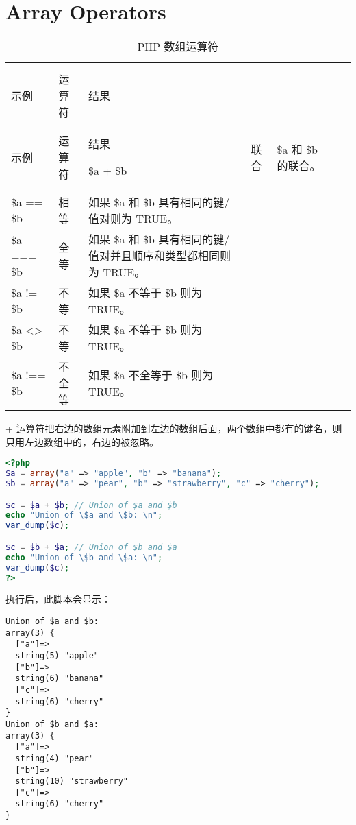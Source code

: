 \section{Array Operators}

\begin{longtable}{|l|l|l|}
\tabularnewline\hline
示例&运算符		&结果
\endhead

\caption{PHP 数组运算符}\\
\hline
示例&运算符		&结果
\endfirsthead

\endfoot

\endlastfoot
\hline
\$a + \$b		&联合	&\$a 和 \$b 的联合。\\
\hline
\$a == \$b	&相等	&如果 \$a 和 \$b 具有相同的键/值对则为 TRUE。\\
\hline
\$a === \$b	&全等	&如果 \$a 和 \$b 具有相同的键/值对并且顺序和类型都相同则为 TRUE。\\
\hline
\$a != \$b	&不等	&如果 \$a 不等于 \$b 则为 TRUE。\\
\hline
\$a <> \$b	&不等	&如果 \$a 不等于 \$b 则为 TRUE。\\
\hline
\$a !== \$b	&不全等	&如果 \$a 不全等于 \$b 则为 TRUE。\\
\hline
\end{longtable}

+ 运算符把右边的数组元素附加到左边的数组后面，两个数组中都有的键名，则只用左边数组中的，右边的被忽略。

\begin{lstlisting}[language=PHP]
<?php
$a = array("a" => "apple", "b" => "banana");
$b = array("a" => "pear", "b" => "strawberry", "c" => "cherry");

$c = $a + $b; // Union of $a and $b
echo "Union of \$a and \$b: \n";
var_dump($c);

$c = $b + $a; // Union of $b and $a
echo "Union of \$b and \$a: \n";
var_dump($c);
?>
\end{lstlisting}

执行后，此脚本会显示：

\begin{verbatim}
Union of $a and $b:
array(3) {
  ["a"]=>
  string(5) "apple"
  ["b"]=>
  string(6) "banana"
  ["c"]=>
  string(6) "cherry"
}
Union of $b and $a:
array(3) {
  ["a"]=>
  string(4) "pear"
  ["b"]=>
  string(10) "strawberry"
  ["c"]=>
  string(6) "cherry"
}
\end{verbatim}

